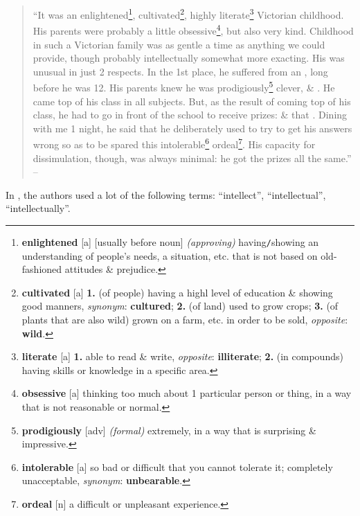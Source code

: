\documentclass{article}
\numberwithin{equation}{section}
\begin{document}
\begin{quotation}
	``It was an enlightened\footnote{\textbf{enlightened} [a] [usually before noun] \textit{(approving)} having\texttt{/}showing an understanding of people's needs, a situation, etc. that is not based on old-fashioned attitudes \& prejudice.}, cultivated\footnote{\textbf{cultivated} [a] \textbf{1.} (of people) having a highl level of education \& showing good manners, \textit{synonym}: \textbf{cultured}; \textbf{2.} (of land) used to grow crops; \textbf{3.} (of plants that are also wild) grown on a farm, etc. in order to be sold, \textit{opposite}: \textbf{wild}.}, highly literate\footnote{\textbf{literate} [a] \textbf{1.} able to read \& write, \textit{opposite}: \textbf{illiterate}; \textbf{2.} (in compounds) having skills or knowledge in a specific area.} Victorian childhood. His parents were probably a little obsessive\footnote{\textbf{obsessive} [a] thinking too much about 1 particular person or thing, in a way that is not reasonable or normal.}, but also very kind. Childhood in such a Victorian family was as gentle a time as anything we could provide, though probably intellectually somewhat more exacting. His was unusual in just 2 respects. In the 1st place, he suffered from an , long before he was 12. His parents knew he was prodigiously\footnote{\textbf{prodigiously} [adv] \textit{(formal)} extremely, in a way that is surprising \& impressive.} clever, \& . He came top of his class in all subjects. But, as the result of coming top of his class, he had to go in front of the school to receive prizes: \& that . Dining with me 1 night, he said that he deliberately used to try to get his answers wrong so as to be spared this intolerable\footnote{\textbf{intolerable} [a] so bad or difficult that you cannot tolerate it; completely unacceptable, \textit{synonym}: \textbf{unbearable}.} ordeal\footnote{\textbf{ordeal} [n] a difficult or unpleasant experience.}. His capacity for dissimulation, though, was always minimal: he got the prizes all the same.'' -- \cite[p. 14]{Hardy1992} 
\end{quotation}
In \cite{Hardy1992}, the authors used a lot of the following terms: ``intellect'', ``intellectual'', ``intellectually''.
\end{document}
